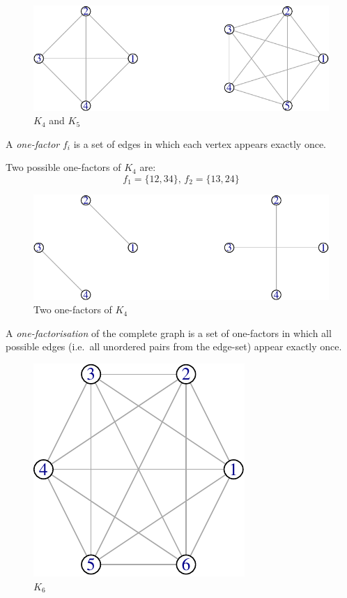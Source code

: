 \documentclass[
  11pt,
  a4paper]{book}
\newcounter{example}
\begin{document}
\begin{figure}
\centering
\includegraphics{figure/complete-graph-1.pdf}
\caption{\(K_4\) and \(K_5\)}
\end{figure}

A \emph{one-factor} \(f_i\) is a set of edges in which each vertex
appears exactly once.

\begin{example}
Two possible one-factors of $K_4$ are:
$$f_1 = \{12,34\},\, f_2 = \{13,24\}$$
\end{example}

\begin{figure}
\centering
\includegraphics{figure/two-one-factors-1.pdf}
\caption{Two one-factors of \(K_{4}\)}
\end{figure}

A \emph{one-factorisation} of the complete graph is a set of one-factors
in which all possible edges (i.e.~all unordered pairs from the edge-set)
appear exactly once.

\begin{figure}
\centering
\includegraphics{figure/K6-1.pdf}
\caption{\(K_6\)}
\end{figure}
\end{document}
